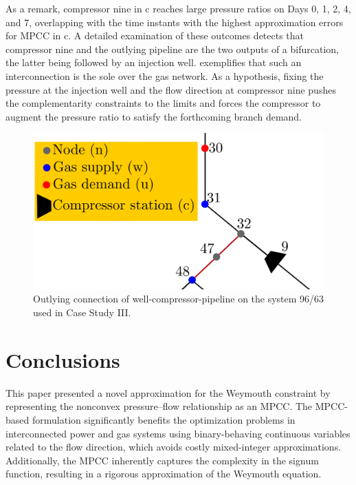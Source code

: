 As a remark, compressor nine in c reaches large pressure ratios on Days 0, 1, 2, 4, and 7, overlapping with the time instants with the highest approximation errors for MPCC in c. A detailed examination of these outcomes detects that compressor nine and the outlying pipeline are the two outputs of a bifurcation, the latter being followed by an injection well.  exemplifies that such an interconnection is the sole over the gas network. As a hypothesis, fixing the pressure at the injection well and the flow direction at compressor nine pushes the complementarity constraints to the limits and forces the compressor to augment the pressure ratio to satisfy the forthcoming branch demand.


\begin{figure}[H]
    \centering
    
    \includegraphics[scale=1.5]{figures/Chapter_MPCC/partial_network}
    \caption{Outlying connection of well-compressor-pipeline on the system 96/63 used in Case Study III.}
    \label{fig:96 63partial network}
\end{figure}

\section{Conclusions} \label{sec: conclusion}

This paper presented a novel approximation for the Weymouth constraint by representing the nonconvex pressure--flow relationship as an MPCC. The MPCC-based formulation significantly benefits the optimization problems in interconnected power and gas systems using binary-behaving continuous variables related to the flow direction, which avoids costly mixed-integer approximations. Additionally, the MPCC inherently captures the complexity in the signum function, resulting in a rigorous approximation of the Weymouth equation.

